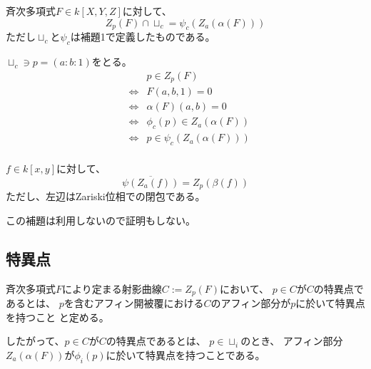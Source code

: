 \documentclass[a4]{article}
\begin{document}
        \begin{Prop}
            斉次多項式$F \in k[X, Y, Z]$に対して、
            \[ Z_p(F) \cap \sqcup_c = \psi_c(Z_a(\alpha(F)))\]
            ただし$\sqcup_c$と$\psi_c$は補題1で定義したものである。
        \end{Prop}
        \begin{Proof}
            $\sqcup_c \ni p=(a : b : 1)$をとる。
            \begin{eqnarray*}
                &{}&    p \in Z_p(F) \\
                &\iff&  F(a,b,1)=0 \\
                &\iff&  \alpha(F)(a,b)=0 \\
                &\iff&  \phi_c(p) \in Z_a(\alpha(F)) \\
                &\iff&  p \in \psi_c(Z_a(\alpha(F))) \\
            \end{eqnarray*}
            \QED
        \end{Proof}

        \begin{Lemma}
            $f \in k[x, y]$に対して、
            \[ \overline{\psi(Z_a(f))}=Z_p(\beta(f)) \]
            ただし、左辺はZariski位相での閉包である。
        \end{Lemma}
        この補題は利用しないので証明もしない。

    \subsection{特異点}
        \begin{Def}[射影曲線の特異点]
            斉次多項式$F$により定まる射影曲線$C:=Z_p(F)$において、
            $p \in C$が$C$の特異点であるとは、
            $p$を含むアフィン開被覆における$C$のアフィン部分が$p$に於いて特異点を持つこと
            と定める。

            したがって、$p \in C$が$C$の特異点であるとは、
            $p \in \sqcup_i$のとき、
            アフィン部分$Z_a(\alpha(F))$が$\phi_i(p)$に於いて特異点を持つことである。
        \end{Def}
\end{document}
